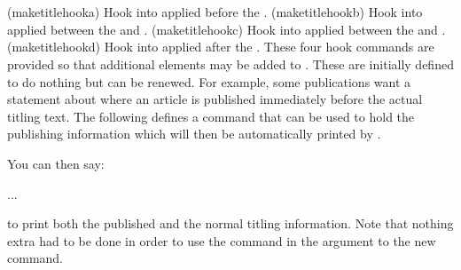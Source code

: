 \begin{syntax}
\cmd{\maketitlehooka} \cmd{\maketitlehookb} \\
\cmd{\maketitlehookc} \cmd{\maketitlehookd} \\
\end{syntax}
\glossary(maketitlehooka)%
  {}%
  {Hook into  applied before the .}
\glossary(maketitlehookb)%
  {}%
  {Hook into  applied between the  and .}
\glossary(maketitlehookc)%
  {}%
  {Hook into  applied between the  and .}
\glossary(maketitlehookd)%
  {}%
  {Hook into  applied after the .}
 These four hook commands are provided so that additional elements may
be added to \cmd{\maketitle}. These are initially defined to do nothing
but can be renewed. For example, some publications
want a statement about where an article is published immediately
before the actual titling text. The following defines a command
\cmd{\published} that can be used to hold the publishing information
which will then be automatically printed by \cmd{\maketitle}.
\begin{lcode}
\newcommand{\published}[1]{%
   \gdef\puB{#1}}
\newcommand{\puB}{}
\renewcommand{\maketitlehooka}{%
   \par\noindent \puB}
\end{lcode}
You can then say:
\begin{lcode}
...
\maketitle
\end{lcode}
to print both the published and the normal titling information. Note
that nothing extra had to be done in order to use the \cmd{\thanks} command
in the argument to the new \cmd{\published} command.


